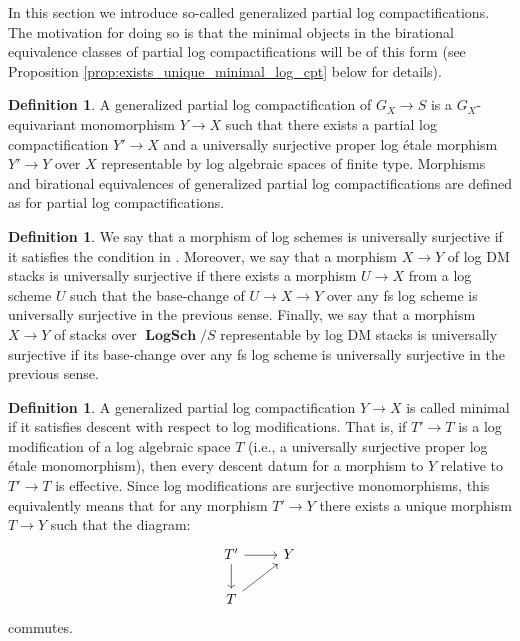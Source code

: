 \documentclass[11pt]{amsart}
\theoremstyle{definition}
\newtheorem{definition}[theorem]{Definition}
\theoremstyle{remark}
\DeclareMathOperator{\LogSch}{\mathbf{LogSch}}
\begin{document}
In this section we introduce so-called generalized partial log
compactifications. The motivation for doing so is that the minimal objects
in the birational equivalence classes of partial log compactifications will be
of this form (see Proposition \ref{prop:exists_unique_minimal_log_cpt} below
for details).

\begin{definition}
	\label{def:generalized_log_cpt}
	A generalized partial log compactification of $G_X\to S$ is a
	$G_X$-equivariant monomorphism $Y\to X$ such that there exists a partial
	log compactification $Y'\to X$ and a universally surjective
	proper log étale morphism $Y'\to Y$ over $X$
	representable by log algebraic spaces of finite type.
	Morphisms and birational
	equivalences of generalized partial log compactifications are defined as
	for partial log compactifications.
\end{definition}

\begin{definition}
	We say that a morphism of log schemes is universally surjective if it satisfies the
	condition in \cite[Proposition 2.2.4.2]{TheLogarithmicMolcho2022}. Moreover, we say
	that a morphism $X\to Y$ of log DM stacks is universally surjective if there exists a
	morphism $U\to X$ from a log scheme $U$ such that the base-change of $U\to X\to Y$ over
	any fs log scheme is universally surjective in the previous sense.
	Finally, we say that a morphism $X\to Y$ of stacks over $\LogSch/S$ representable
	by log DM stacks is universally surjective if its base-change
	over any fs log scheme is universally surjective in the previous sense.
\end{definition}

\begin{definition}
	\label{def:minimal_cpt}
	A generalized partial log compactification $Y\to X$ is called minimal if it satisfies descent with respect to log modifications.
	That is, if $T'\to T$ is a log modification of a log algebraic space
	$T$ (i.e., a universally surjective proper log étale monomorphism),
	then every descent datum for a morphism
	to $Y$ relative to $T'\to T$ is effective. Since log modifications are surjective monomorphisms, this equivalently means that for any morphism $T'\to Y$ there exists a unique morphism $T\to Y$ such that the diagram:
    $$\begin{tikzcd}
        T'\arrow[d]\arrow[r]&Y\\
        T\arrow[ur]&
    \end{tikzcd}$$
    commutes.
\end{definition}
\end{document}
